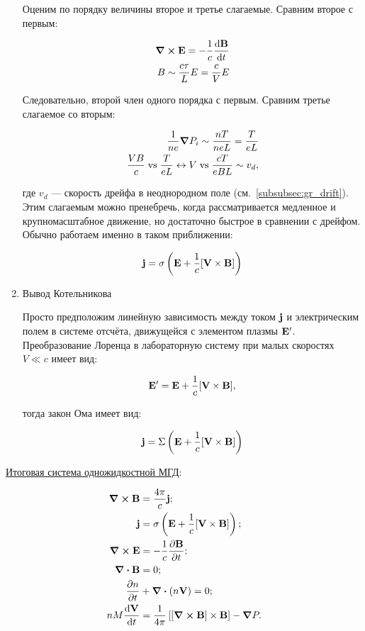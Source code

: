 \documentclass[10pt, a4paper]{article}
\begin{document}
\begin{enumerate}
Оценим по порядку величины второе и третье слагаемые. Сравним второе с первым:

\begin{align*}
	\curl\vb{E} = -\frac{1}{c}\dv{\vb{B}}{t} \\
	B \sim \frac{c\tau}{L} E = \frac{c}{V} E
\end{align*}

Следовательно, второй член одного порядка с первым. Сравним третье слагаемое со вторым:

\begin{align*}
	\frac{1}{n e}\grad P_i \sim \frac{n T}{n e L} = \frac{T}{eL} \\
	\frac{VB}{c}\;\text{vs}\;\frac{T}{eL} \leftrightarrow V\;\text{vs}\;\frac{cT}{eBL} \sim v_{d},
\end{align*}

где $v_{d}$ --- скорость дрейфа в неоднородном поле (см.~\ref{subsubsec:gr_drift}). Этим слагаемым можно пренебречь, когда рассматривается медленное и крупномасштабное движение, но достаточно быстрое в сравнении с дрейфом. Обычно работаем именно в таком приближении:

\begin{equation*}
	\vb{j} = \sigma \left( \vb{E} + \frac{1}{c}[\vb{V}\times\vb{B}]\right)
\end{equation*}

\item Вывод Котельникова~\cite{kotelnikov}

Просто предположим линейную зависимость между током $\vb{j}$ и электрическим полем в системе отсчёта, движущейся с элементом плазмы $\vb{E}'$. Преобразование Лоренца в лабораторную систему при малых скоростях $V \ll c$ имеет вид:

\begin{equation*}
	\vb{E}' = \vb{E} + \frac{1}{c}[\vb{V}\times \vb{B}],
\end{equation*}

тогда закон Ома имеет вид:

\begin{equation*}
	\vb{j} = \Sigma\left( \vb{E} + \frac{1}{c}[\vb{V}\times \vb{B}] \right)
\end{equation*}

\end{enumerate}

\uline{Итоговая система одножидкостной МГД}:

\begin{align}
	\label{eq:MGD_curlB_eq} \curl{\vb{B}} &= \frac{4\pi}{c}\vb{j};\\
	\label{eq:MGD_Ohm_eq} \vb{j} &= \sigma\left(\vb{E} + \frac{1}{c}[\vb{V}\times\vb{B}] \right); \\
	\curl{\vb{E}} &= -\frac{1}{c}\pdv{\vb{B}}{t}; \\
	\div{\vb{B}} &= 0; \\
	\pdv{n}{t} &+ \div{\left(n\vb{V}\right)} = 0; \\
	\label{eq:MGD_motion_eq} n M \dv{\vb{V}}{t} &= \frac{1}{4\pi}\left[\left[\curl{\vb{B}} \right]\times\vb{B}\right]-\grad{P}. 
\end{align}
\end{document}
